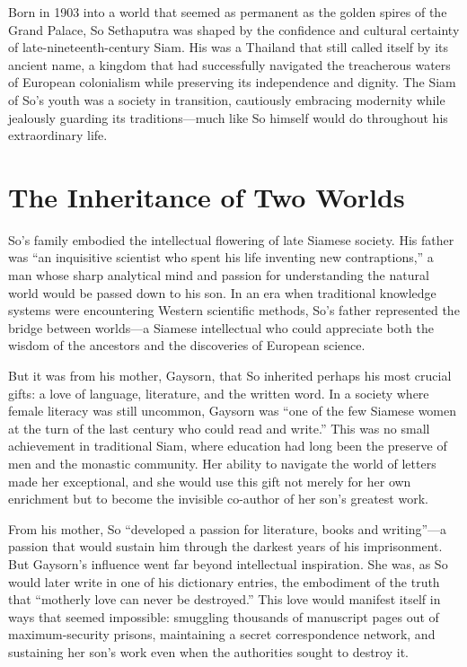 \documentclass[
  Letterpaper,
]{scrbook}
\begin{document}
Born in 1903 into a world that seemed as permanent as the golden spires
of the Grand Palace, So Sethaputra was shaped by the confidence and
cultural certainty of late-nineteenth-century Siam. His was a Thailand
that still called itself by its ancient name, a kingdom that had
successfully navigated the treacherous waters of European colonialism
while preserving its independence and dignity. The Siam of So's youth
was a society in transition, cautiously embracing modernity while
jealously guarding its traditions---much like So himself would do
throughout his extraordinary life.

\section{The Inheritance of Two
Worlds}\label{the-inheritance-of-two-worlds}

So's family embodied the intellectual flowering of late Siamese society.
His father was ``an inquisitive scientist who spent his life inventing
new contraptions,'' a man whose sharp analytical mind and passion for
understanding the natural world would be passed down to his son. In an
era when traditional knowledge systems were encountering Western
scientific methods, So's father represented the bridge between
worlds---a Siamese intellectual who could appreciate both the wisdom of
the ancestors and the discoveries of European science.

But it was from his mother, Gaysorn, that So inherited perhaps his most
crucial gifts: a love of language, literature, and the written word. In
a society where female literacy was still uncommon, Gaysorn was ``one of
the few Siamese women at the turn of the last century who could read and
write.'' This was no small achievement in traditional Siam, where
education had long been the preserve of men and the monastic community.
Her ability to navigate the world of letters made her exceptional, and
she would use this gift not merely for her own enrichment but to become
the invisible co-author of her son's greatest work.

From his mother, So ``developed a passion for literature, books and
writing''---a passion that would sustain him through the darkest years
of his imprisonment. But Gaysorn's influence went far beyond
intellectual inspiration. She was, as So would later write in one of his
dictionary entries, the embodiment of the truth that ``motherly love can
never be destroyed.'' This love would manifest itself in ways that
seemed impossible: smuggling thousands of manuscript pages out of
maximum-security prisons, maintaining a secret correspondence network,
and sustaining her son's work even when the authorities sought to
destroy it.
\end{document}
